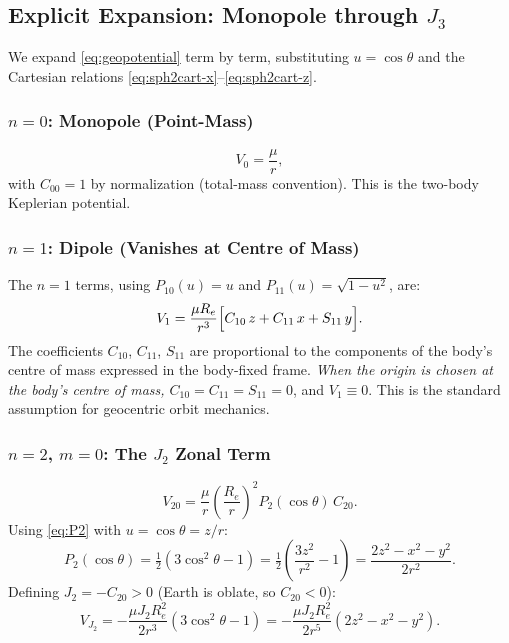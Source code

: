 \documentclass[11pt]{article}
\begin{document}
\subsection{Explicit Expansion: Monopole through $J_3$}
\label{ssec:explicit}

We expand \eqref{eq:geopotential} term by term, substituting $u = \cos\theta$
and the Cartesian relations \eqref{eq:sph2cart-x}--\eqref{eq:sph2cart-z}.

\subsubsection{$n=0$: Monopole (Point-Mass)}

\begin{equation}
  V_0 = \frac{\mu}{r},
  \label{eq:V0}
\end{equation}
with $C_{00} = 1$ by normalization (total-mass convention).
This is the two-body Keplerian potential.

\subsubsection{$n=1$: Dipole (Vanishes at Centre of Mass)}

The $n=1$ terms, using $P_{10}(u)=u$ and $P_{11}(u)=\sqrt{1-u^2}$, are:
\begin{equation}
  V_1 = \frac{\mu R_e}{r^3}
        \Bigl[C_{10}\,z + C_{11}\,x + S_{11}\,y\Bigr].
  \label{eq:V1-cart}
\end{equation}
The coefficients $C_{10}$, $C_{11}$, $S_{11}$ are proportional to the
components of the body's centre of mass expressed in the body-fixed frame.
\emph{When the origin is chosen at the body's centre of mass,
$C_{10}=C_{11}=S_{11}=0$}, and $V_1 \equiv 0$.  This is the standard
assumption for geocentric orbit mechanics.

\subsubsection{$n=2$, $m=0$: The $J_2$ Zonal Term}

\begin{equation}
  V_{20} = \frac{\mu}{r}\left(\frac{R_e}{r}\right)^{\!2}
            P_2(\cos\theta)\,C_{20}.
  \label{eq:V20}
\end{equation}
Using \eqref{eq:P2} with $u=\cos\theta=z/r$:
\begin{equation}
  P_2(\cos\theta)
  = \tfrac{1}{2}(3\cos^2\theta - 1)
  = \tfrac{1}{2}\!\left(\frac{3z^2}{r^2} - 1\right)
  = \frac{2z^2 - x^2 - y^2}{2r^2}.
  \label{eq:P2-cart}
\end{equation}
Defining $J_2 = -C_{20} > 0$ (Earth is oblate, so $C_{20} < 0$):
\begin{equation}
  \boxed{
  V_{J_2}
  = -\frac{\mu J_2 R_e^2}{2r^3}\left(3\cos^2\theta - 1\right)
  = -\frac{\mu J_2 R_e^2}{2r^5}\left(2z^2 - x^2 - y^2\right).
  }
  \label{eq:V-J2}
\end{equation}
\end{document}
